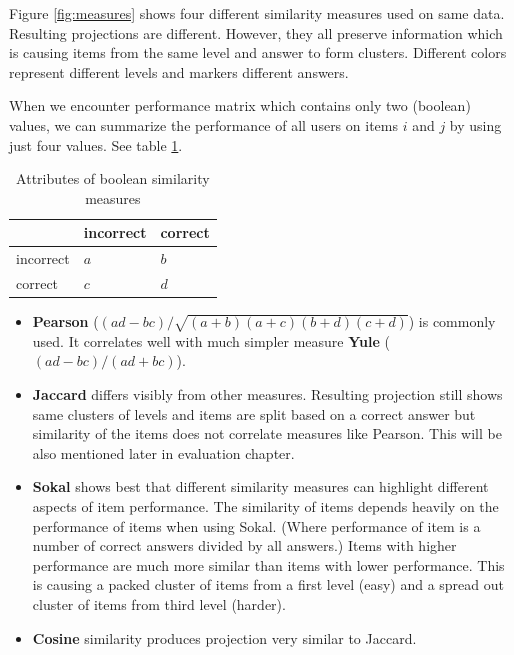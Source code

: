 \documentclass[
  digital, %
  table,   %
  nolof,     %
  nolot,     %
  nocover
]{fithesis3}
\begin{document}

Figure \ref{fig:measures} shows four different similarity measures used on same data. Resulting projections are different. However, they all preserve information which is causing items from the same level and answer to form clusters. Different colors represent different levels and markers different answers.


When we encounter performance matrix which contains only two (boolean) values, we can summarize the performance of all users on items $i$ and $j$ by using just four values. See table \ref{tab:boolean-attributes}.

\begin{table}
  \begin{tabular}{ | l | l | l | }
  \hline
       & incorrect & correct \\ \hline
      incorrect & $a$ & $b$ \\ \hline
      correct & $c$ & $d$ \\ \hline
  \end{tabular}
  \caption{Attributes of boolean similarity measures}
  \label{tab:boolean-attributes}
\end{table}

\begin{itemize}
\item
  \textbf{Pearson} ($(ad - bc) / \sqrt{(a+b)(a+c)(b+d)(c+d)}$) is commonly used. It correlates well with much simpler measure \textbf{Yule} ($(ad-bc)/(ad+bc)$).

\item
  \textbf{Jaccard} differs visibly from other measures. Resulting projection still shows same clusters of levels and items are split based on a correct answer but similarity of the items does not correlate measures like Pearson. This will be also mentioned later in evaluation chapter.

\item
  \textbf{Sokal} shows best that different similarity measures can highlight different aspects of item performance. The similarity of items depends heavily on the performance of items when using Sokal. (Where performance of item is a number of correct answers divided by all answers.) Items with higher performance are much more similar than items with lower performance. This is causing a packed cluster of items from a first level (easy) and a spread out cluster of items from third level (harder).

\item
  \textbf{Cosine} similarity produces projection very similar to Jaccard.
\end{itemize}
\end{document}
